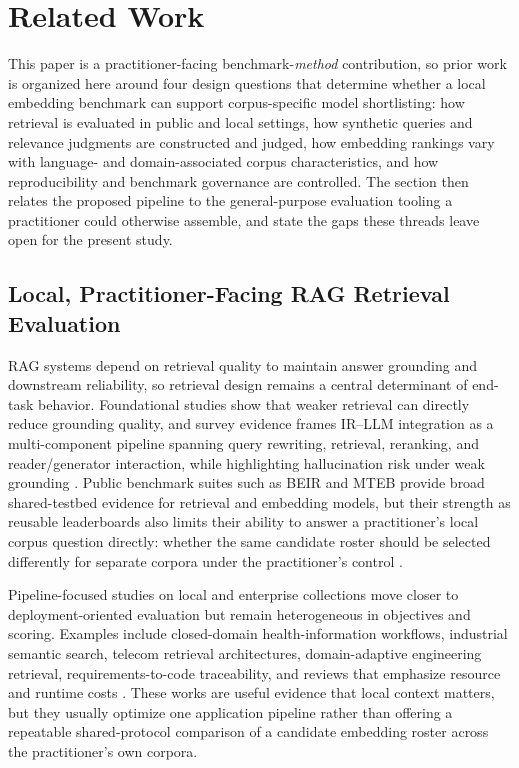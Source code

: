 \section{Related Work}\label{related-work}

This paper is a practitioner-facing benchmark-\emph{method} contribution, so prior work is organized here around four design questions that determine whether a local embedding benchmark can support corpus-specific model shortlisting: how retrieval is evaluated in public and local settings, how synthetic queries and relevance judgments are constructed and judged, how embedding rankings vary with language- and domain-associated corpus characteristics, and how reproducibility and benchmark governance are controlled. The section then relates the proposed pipeline to the general-purpose evaluation tooling a practitioner could otherwise assemble, and state the gaps these threads leave open for the present study.

\subsection{Local, Practitioner-Facing RAG Retrieval Evaluation}\label{rw-local-rag}

RAG systems depend on retrieval quality to maintain answer grounding and downstream reliability, so retrieval design remains a central determinant of end-task behavior. Foundational studies show that weaker retrieval can directly reduce grounding quality, and survey evidence frames IR--LLM integration as a multi-component pipeline spanning query rewriting, retrieval, reranking, and reader/generator interaction, while highlighting hallucination risk under weak grounding \citep{Lewis_RAG_2021, Zhu_LLMIR_Survey_2025}. Public benchmark suites such as BEIR and MTEB provide broad shared-testbed evidence for retrieval and embedding models, but their strength as reusable leaderboards also limits their ability to answer a practitioner's local corpus question directly: whether the same candidate roster should be selected differently for separate corpora under the practitioner's control \citep{Thakur_BEIR_2021, Muennighoff_MTEB_2023}.

Pipeline-focused studies on local and enterprise collections move closer to deployment-oriented evaluation but remain heterogeneous in objectives and scoring. Examples include closed-domain health-information workflows, industrial semantic search, telecom retrieval architectures, domain-adaptive engineering retrieval, requirements-to-code traceability, and reviews that emphasize resource and runtime costs \citep{Cummings_2025, Yozkan_2025, Khan_TelcoGPT_2025, Szabo_2025, ali2024establishing, Yunianto_2020}. These works are useful evidence that local context matters, but they usually optimize one application pipeline rather than offering a repeatable shared-protocol comparison of a candidate embedding roster across the practitioner's own corpora.

